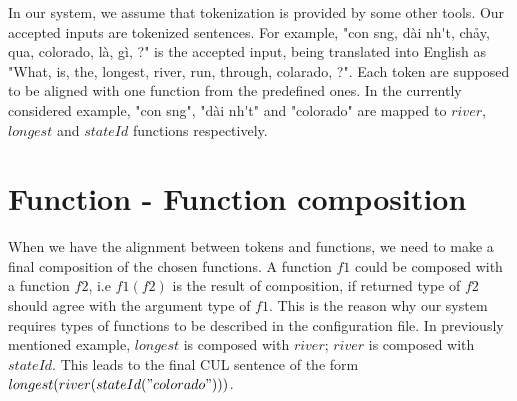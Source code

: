 In our system, we assume that tokenization is provided by some other tools. Our accepted inputs are tokenized sentences. For example, "{\selectfont con s\ocircumflex ng, d\`ai nh\'\acircumflex t, ch\h{a}y, qua, colorado, l\`a, g\`i, ?}" is the accepted input, being translated into English as "What, is, the, longest, river, run, through, colarado, ?". Each token are supposed to be aligned with one function from the predefined ones. In the currently considered example, "{\selectfont con s\ocircumflex ng", "d\`ai nh\'\acircumflex t" and "colorado"} are mapped to $river$, $longest$ and $stateId$ functions respectively. 

\section{Function - Function composition}
When we have the alignment between tokens and functions, we need to make a final composition of the chosen functions. A function $f1$ could be composed with a function $f2$, i.e $f1(f2)$ is the result of composition, if returned type of $f2$ should agree with the argument type of $f1$. This is the reason why our system requires types of functions to be described in the configuration file. In previously mentioned example, $longest$ is composed with $river$; $river$ is composed with $stateId$. This leads to the final CUL sentence of the form $longest(river(stateId("colorado")))$.